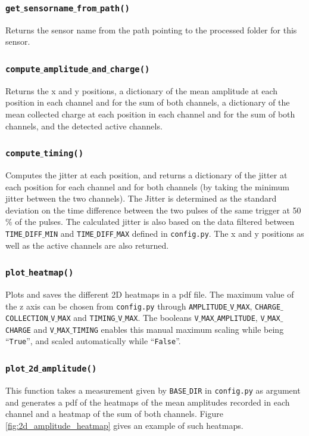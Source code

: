 \subsubsection{\texttt{get$\_$sensorname$\_$from$\_$path()}}
Returns the sensor name from the path pointing to the processed folder for this sensor.

\subsubsection{\texttt{compute$\_$amplitude$\_$and$\_$charge()}}
Returns the x and y positions, a dictionary of the mean amplitude at each position in each channel and for the sum of both channels, a dictionary of the mean collected charge at each position in each channel and for the sum of both channels, and the detected active channels.

\subsubsection{\texttt{compute$\_$timing()}}
Computes the jitter at each position, and returns a dictionary of the jitter at each position for each channel and for both channels (by taking the minimum jitter between the two channels). The Jitter is determined as the standard deviation on the time difference between the two pulses of the same trigger at 50$\%$ of the pulses. The calculated jitter is also based on the data filtered between \texttt{TIME$\_$DIFF$\_$MIN} and \texttt{TIME$\_$DIFF$\_$MAX} defined in \texttt{config.py}. The x and y positions as well as the active channels are also returned.

\subsubsection{\texttt{plot$\_$heatmap()}}
Plots and saves the different 2D heatmaps in a pdf file. The maximum value of the z axis can be chosen from \texttt{config.py} through \texttt{AMPLITUDE$\_$V$\_$MAX}, \texttt{CHARGE$\_$COLLECTION$\_$V$\_$MAX} and \texttt{TIMING$\_$V$\_$MAX}. The booleans \texttt{V$\_$MAX$\_$AMPLITUDE}, \texttt{V$\_$MAX$\_$CHARGE} and \texttt{V$\_$MAX$\_$TIMING} enables this manual maximum scaling while being \enquote{\texttt{True}}, and scaled automatically  while \enquote{\texttt{False}}.

\subsubsection{\texttt{plot$\_$2d$\_$amplitude()}}
This function takes a measurement given by \texttt{BASE$\_$DIR} in \texttt{config.py} as argument and generates a pdf of the heatmaps of the mean amplitudes recorded in each channel and a heatmap of the sum of both channels. Figure \ref{fig:2d_amplitude_heatmap} gives an example of such heatmaps.

